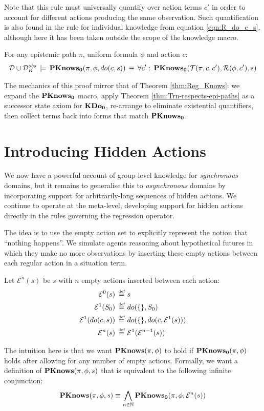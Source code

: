 Note that this rule must universally quantify over action terms $c'$
in order to account for different actions producing the same observation.
Such quantification is also found in the rule for individual knowledge
from equation \eqref{eqn:R_do_c_s}, although here it has been taken
outside the scope of the knowledge macro.

\begin{thm}
\label{thm:Reg_PKnowsZ}For any epistemic path $\pi$, uniform formula
$\phi$ and action $c$:\begin{gather*}
\mathcal{D}\cup\mathcal{D}_{K}^{obs}\,\models\,\mathbf{PKnows_{0}}(\pi,\phi,do(c,s))\,\equiv\,\forall c':\,\mathbf{PKnows_{0}}(\mathcal{T}(\pi,c,c'),\mathcal{R}(\phi,c'),s)\end{gather*}

\end{thm}
\begin{proofsketch}
The mechanics of this proof mirror that of Theorem \ref{thm:Reg_Knows}:
we expand the $\mathbf{PKnows_{0}}$ macro, apply Theorem \ref{thm:Trn-respects-epi-paths}
as a successor state axiom for $\mathbf{KDo_{0}}$, re-arrange to eliminate existential
quantifiers, then collect terms back into forms that match $\mathbf{PKnows_{0}}$. 
\end{proofsketch}

\section{Introducing Hidden Actions\label{sub:Introducing-Hidden-Actions}}

We now have a powerful account of group-level knowledge for \emph{synchronous}
domains, but it remains to generalise this to \emph{asynchronous}
domains by incorporating support for arbitrarily-long sequences of
hidden actions. We continue to operate at the meta-level, developing
support for hidden actions directly in the rules governing the regression
operator.

The idea is to use the empty action set to explicitly represent the
notion that {}``nothing happens''. We simulate agents reasoning
about hypothetical futures in which they make no more observations
by inserting these empty actions between each regular action in a
situation term.

\begin{defn}
Let $\mathcal{E}^{n}(s)$ be $s$ with $n$ empty actions inserted
between each action:\begin{align*}
\mathcal{E}^{0}(s)\,\stackrel{\mbox{\tiny def}}{=}\,\, & s\\
\mathcal{E}^{1}(S_{0})\,\stackrel{\mbox{\tiny def}}{=}\,\, & do(\{\},S_{0})\\
\mathcal{E}^{1}(do(c,s))\,\stackrel{\mbox{\tiny def}}{=}\,\, & do(\{\},do(c,\mathcal{E}^{1}(s)))\\
\mathcal{E}^{n}(s)\,\stackrel{\mbox{\tiny def}}{=}\,\, & \mathcal{E}^{1}(\mathcal{E}^{n-1}(s))\end{align*}

\end{defn}
The intuition here is that we want $\mathbf{PKnows}(\pi,\phi)$ to hold if
$\mathbf{PKnows_{0}}(\pi,\phi)$ holds after allowing for any number of empty
actions. Formally, we want a definition of $\mathbf{PKnows}(\pi,\phi,s)$
that is equivalent to the following infinite conjunction:\[
\mathbf{PKnows}(\pi,\phi,s)\equiv\bigwedge_{n\in\mathbb{N}}\mathbf{PKnows_{0}}(\pi,\phi,\mathcal{E}^{n}(s))\]


